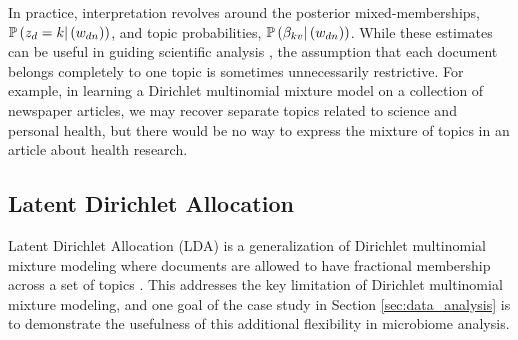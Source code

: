 In practice, interpretation revolves around the posterior mixed-memberships,
$\mathbb{P}\left({z_{d} = k \vert \left(w_{dn}\right)}\right)$, and topic probabilities,
$\mathbb{P}\left({\beta_{kv}\vert \left(w_{dn}\right)}\right)$. While these estimates can be
useful in guiding scientific analysis \citep{nigam2000text,
  holmes2012dirichlet}, the assumption that each document belongs completely to
one topic is sometimes unnecessarily restrictive. For example, in learning a
Dirichlet multinomial mixture model on a collection of newspaper articles, we
may recover separate topics related to science and personal health, but there
would be no way to express the mixture of topics in an article about health
research.

\subsection{Latent Dirichlet Allocation}

Latent Dirichlet Allocation (LDA) is a generalization of Dirichlet multinomial
mixture modeling where documents are allowed to have fractional membership
across a set of topics \citep{blei2003latent}. This addresses the key limitation
of Dirichlet multinomial mixture modeling, and one goal of the case study in
Section \ref{sec:data_analysis} is to demonstrate the usefulness of this
additional flexibility in microbiome analysis.

